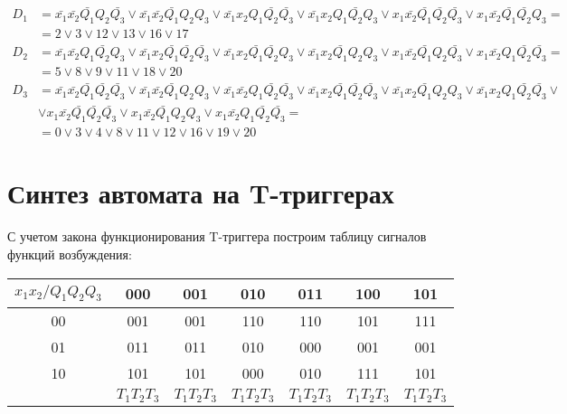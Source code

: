 \documentclass[listings]{labreport}
\begin{document}
\begin{align*}
D_1 & = \bar{x_1}\bar{x_2}\bar{Q_1}Q_2\bar{Q_3} \lor \bar{x_1}\bar{x_2}\bar{Q_1}Q_2Q_3 \lor \bar{x_1}x_2Q_1\bar{Q_2}\bar{Q_3} \lor \bar{x_1}x_2Q_1\bar{Q_2}Q_3 \lor x_1\bar{x_2}\bar{Q_1}\bar{Q_2}\bar{Q_3} \lor x_1\bar{x_2}\bar{Q_1}\bar{Q_2}Q_3 = \\ & = 2 \lor 3 \lor 12 \lor 13 \lor 16 \lor 17 \\
D_2 & = \bar{x_1}\bar{x_2}Q_1\bar{Q_2}Q_3 \lor \bar{x_1}x_2\bar{Q_1}\bar{Q_2}\bar{Q_3} \lor \bar{x_1}x_2\bar{Q_1}\bar{Q_2}Q_3 \lor \bar{x_1}x_2\bar{Q_1}Q_2Q_3 \lor x_1\bar{x_2}\bar{Q_1}Q_2\bar{Q_3} \lor x_1\bar{x_2}Q_1\bar{Q_2}\bar{Q_3}       = \\ & = 5 \lor 8 \lor 9 \lor 11 \lor 18 \lor 20 \\
D_3 & = \bar{x_1}\bar{x_2}\bar{Q_1}\bar{Q_2}\bar{Q_3} \lor \bar{x_1}\bar{x_2}\bar{Q_1}Q_2Q_3 \lor \bar{x_1}\bar{x_2}Q_1\bar{Q_2}\bar{Q_3} \lor \bar{x_1}x_2\bar{Q_1}\bar{Q_2}\bar{Q_3} \lor \bar{x_1}x_2\bar{Q_1}Q_2Q_3 \lor \bar{x_1}x_2Q_1\bar{Q_2}\bar{Q_3} \lor \\ & \lor x_1\bar{x_2}\bar{Q_1}\bar{Q_2}\bar{Q_3} \lor x_1\bar{x_2}\bar{Q_1}Q_2Q_3 \lor x_1\bar{x_2}Q_1\bar{Q_2}\bar{Q_3} = \\ & = 0 \lor 3 \lor 4 \lor 8 \lor 11 \lor 12 \lor 16 \lor 19 \lor 20
\end{align*}

\section*{Синтез автомата на T-триггерах}

С учетом закона функционирования T-триггера построим таблицу
сигналов функций возбуждения:

\begin{tabular}{|*{7}{c|}}
\hline
$x_1x_2/Q_1Q_2Q_3$ & 000 & 001 & 010 & 011 & 100 & 101\\\hline
00 & 001 & 001 & 110 & 110 & 101 & 111\\\hline
01 & 011 & 011 & 010 & 000 & 001 & 001\\\hline
10 & 101 & 101 & 000 & 010 & 111 & 101\\\hline
 & $T_1T_2T_3$ & $T_1T_2T_3$ & $T_1T_2T_3$ & $T_1T_2T_3$ & $T_1T_2T_3$ & $T_1T_2T_3$\\\hline
\end{tabular}
\end{document}
